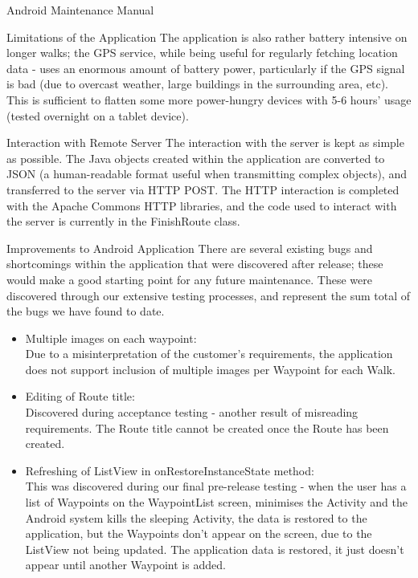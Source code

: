 \documentclass{article}
\begin{document}
\begin{section}{Android Maintenance Manual}
\begin{subsection}{Limitations of the Application}
		The application is also rather battery intensive on longer walks; the GPS service, while being useful for regularly fetching location data - uses an enormous amount of battery power, particularly if the GPS signal is bad (due to overcast weather, large buildings in the surrounding area, etc). This is sufficient to flatten some more power-hungry devices with 5-6 hours' usage (tested overnight on a tablet device).
	\end{subsection}
	
	\begin{subsection}{Interaction with Remote Server}
		The interaction with the server is kept as simple as possible. The Java objects created within the application are converted to JSON (a human-readable format useful when transmitting complex objects), and transferred to the server via HTTP POST. The HTTP interaction is completed with the Apache Commons HTTP libraries, and the code used to interact with the server is currently in the FinishRoute class.
	\end{subsection}
	
	\newpage
	\begin{subsection}{Improvements to Android Application}
		There are several existing bugs and shortcomings within the application that were discovered after release; these would make a good starting point for any future maintenance. These were discovered through our extensive testing processes, and represent the sum total of the bugs we have found to date.
		
		\begin{itemize}
			\item{Multiple images on each waypoint: \\
			Due to a misinterpretation of the customer's requirements, the application does not support inclusion of multiple images per Waypoint for each Walk.}
			\item{Editing of Route title: \\
			Discovered during acceptance testing - another result of misreading requirements. The Route title cannot be created once the Route has been created.}
			\item{Refreshing of ListView in onRestoreInstanceState method: \\
			This was discovered during our final pre-release testing - when the user has a list of Waypoints on the WaypointList screen, minimises the Activity and the Android system kills the sleeping Activity, the data is restored to the application, but the Waypoints don't appear on the screen, due to the ListView not being updated. The application data is restored, it just doesn't appear until another Waypoint is added.}
		\end{itemize}
	\end{subsection}
	

\end{section}
\end{document}
